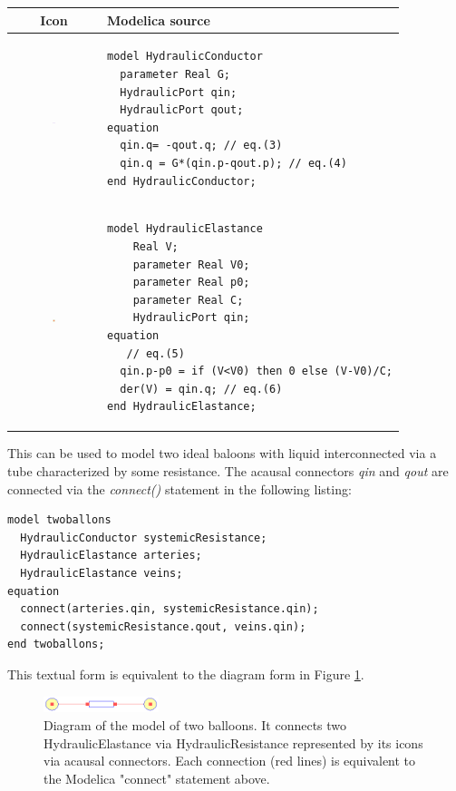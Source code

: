 \documentclass[letterpaper, 10 pt, conference]{ieeeconf}  %
\begin{document}
\begin{tabular}{cl}
Icon & Modelica source \\
\hline
\includegraphics[width=0.03\textwidth]{Resistance.png} & 
\begin{lstlisting}[language=modelica, backgroundcolor=\color{white}]
model HydraulicConductor
  parameter Real G;
  HydraulicPort qin;
  HydraulicPort qout;
equation 
  qin.q= -qout.q; // eq.(3)
  qin.q = G*(qin.p-qout.p); // eq.(4)
end HydraulicConductor;
\end{lstlisting} \\
\hline
\includegraphics[width=0.03\textwidth]{Elasticity.png} & 
\begin{lstlisting}[language=modelica, backgroundcolor=\color{white}]
model HydraulicElastance
    Real V;
    parameter Real V0;
    parameter Real p0;
    parameter Real C;
    HydraulicPort qin;
equation 
   // eq.(5)
  qin.p-p0 = if (V<V0) then 0 else (V-V0)/C;
  der(V) = qin.q; // eq.(6)
end HydraulicElastance;
\end{lstlisting}
\end{tabular}

This can be used to model two ideal baloons with liquid  interconnected via a tube characterized by some resistance. The acausal connectors \emph{qin} and \emph{qout} are connected via the \emph{connect()} statement in the following listing:
\begin{lstlisting}[language=modelica]
model twoballons
  HydraulicConductor systemicResistance;
  HydraulicElastance arteries;
  HydraulicElastance veins;
equation 
  connect(arteries.qin, systemicResistance.qin);
  connect(systemicResistance.qout, veins.qin);
end twoballons;
\end{lstlisting}

This textual form is equivalent to the diagram form in Figure \ref{fig:twoballons}.
\begin{figure}[h!]
    \centering
    \includegraphics[width=0.3\textwidth]{twoballons.png}
    \caption{Diagram of the model of two balloons. It connects two HydraulicElastance via HydraulicResistance represented by its icons via acausal connectors. Each connection (red lines) is equivalent to the Modelica "connect" statement above.
    }
    \label{fig:twoballons}
\end{figure}
\end{document}
